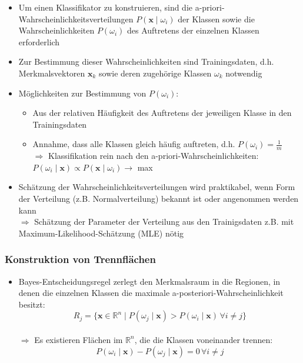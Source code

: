 \documentclass[11pt]{article}
\begin{document}
\begin{itemize}
    \item Um einen Klassifikator zu konstruieren, sind die a-priori-Wahrscheinlichkeitsverteilungen $P(\boldsymbol{x} \mid \omega_i)$ der Klassen sowie die Wahrscheinlichkeiten $P(\omega_i)$ des Auftretens der einzelnen Klassen erforderlich
    \item Zur Bestimmung dieser Wahrscheinlichkeiten sind Trainingsdaten, d.h. Merkmalsvektoren $\boldsymbol{x}_k$ sowie deren zugehörige Klassen $\omega_k$ notwendig
    \item Möglichkeiten zur Bestimmung von $P(\omega_i)$:
        \begin{itemize}
            \item Aus der relativen Häufigkeit des Auftretens der jeweiligen Klasse in den Trainingsdaten
            \item Annahme, dass alle Klassen gleich häufig auftreten, d.h. $P(\omega_i) = \frac{1}{m}$
            \\ $\Rightarrow$ Klassifikation rein nach den a-priori-Wahrscheinlichkeiten: $P(\omega_i \mid \boldsymbol{x}) \propto P(\boldsymbol{x} \mid \omega_i) \rightarrow$ max
        \end{itemize}
    \item Schätzung der Wahrscheinlichkeitsverteilungen wird praktikabel, wenn Form der Verteilung (z.B. Normalverteilung) bekannt ist oder angenommen werden kann
    \\ $\Rightarrow$ Schätzung der Parameter der Verteilung aus den Trainigsdaten z.B. mit Maximum-Likelihood-Schätzung (MLE) nötig
\end{itemize}


\subsubsection{Konstruktion von Trennflächen}

\begin{itemize}
    \item Bayes-Entscheidungsregel zerlegt den Merkmalsraum in die Regionen, in denen die einzelnen Klassen die maximale a-posteriori-Wahrscheinlichkeit besitzt:
    $$R_j = \{\boldsymbol{x} \in \mathbb{R}^n \mid P(\omega_j \mid \boldsymbol{x}) > P(\omega_i \mid \boldsymbol{x}) \, \forall i \neq j\}$$
    \\ $\Rightarrow$ Es existieren Flächen im $\mathbb{R}^n$, die die Klassen voneinander trennen:
    $$P(\omega_i \mid \boldsymbol{x}) - P(\omega_j \mid \boldsymbol{x}) = 0 \, \forall i \neq j$$
\end{itemize}
\end{document}

